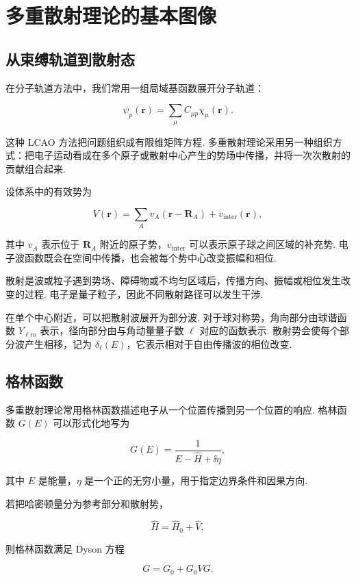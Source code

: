 \documentclass[UTF8,11pt,a4paper,openany]{ctexbook}
\begin{document}
\section{多重散射理论的基本图像}

\subsection{从束缚轨道到散射态}

在分子轨道方法中，我们常用一组局域基函数展开分子轨道：

\[
\psi_p(\mathbf r)
=
\sum_\mu C_{\mu p}\chi_\mu(\mathbf r).
\]

这种 LCAO 方法把问题组织成有限维矩阵方程. 多重散射理论采用另一种组织方式：把电子运动看成在多个原子或散射中心产生的势场中传播，并将一次次散射的贡献组合起来. 

设体系中的有效势为

\[
V(\mathbf r)
=
\sum_A v_A(\mathbf r-\mathbf R_A)
+
v_{\mathrm{inter}}(\mathbf r),
\]

其中 $v_A$ 表示位于 $\mathbf R_A$ 附近的原子势，$v_{\mathrm{inter}}$ 可以表示原子球之间区域的补充势. 电子波函数既会在空间中传播，也会被每个势中心改变振幅和相位. 

\begin{definitionbox}
散射是波或粒子遇到势场、障碍物或不均匀区域后，传播方向、振幅或相位发生改变的过程. 电子是量子粒子，因此不同散射路径可以发生干涉. 
\end{definitionbox}

在单个中心附近，可以把散射波展开为部分波. 对于球对称势，角向部分由球谐函数 $Y_{\ell m}$ 表示，径向部分由与角动量量子数 $\ell$ 对应的函数表示. 散射势会使每个部分波产生相移，记为 $\delta_\ell(E)$，它表示相对于自由传播波的相位改变. 

\subsection{格林函数}

多重散射理论常用格林函数描述电子从一个位置传播到另一个位置的响应. 格林函数 $G(E)$ 可以形式化地写为

\[
G(E)
=
\frac{1}{E-\hat H+\ii\eta},
\]

其中 $E$ 是能量，$\eta$ 是一个正的无穷小量，用于指定边界条件和因果方向. 

若把哈密顿量分为参考部分和散射势，

\[
\hat H=\hat H_0+\hat V,
\]

则格林函数满足 Dyson 方程

\[
G=G_0+G_0VG.
\]
\end{document}

